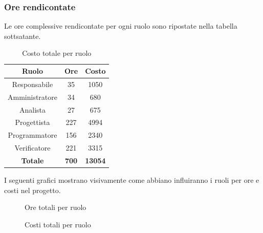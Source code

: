 \subsubsection{Ore rendicontate}
Le ore complessive rendicontate per ogni ruolo sono ripostate nella tabella sottsatante.
\begin{table}[H]
	\centering
	\begin{tabular}{|c|c|c|}
		\hline
		\textbf{Ruolo} &
		\textbf{Ore} &
		\textbf{Costo} \\
		\hline
		Responsabile & 35 & 1050\\
		\hline
		Amministratore & 34 & 680\\
		\hline
		Analista & 27 & 675\\
		\hline
		Progettista & 227 & 4994 \\
		\hline
		Programmatore & 156 & 2340 \\
		\hline
		Verificatore & 221 & 3315\\
		\hline
		\textbf{Totale} & \textbf{700} & \textbf{13054} \\
		\hline
	\end{tabular}
	\caption{Costo totale per ruolo}
\end{table}
I seguenti grafici mostrano visivamente come abbiano influiranno i ruoli per ore e costi nel progetto.
\begin{figure}[H]
	\centering
	\caption{Ore totali per ruolo}
\end{figure}
\begin{figure}[H]
	\centering
	\caption{Costi totali per ruolo}
\end{figure}





